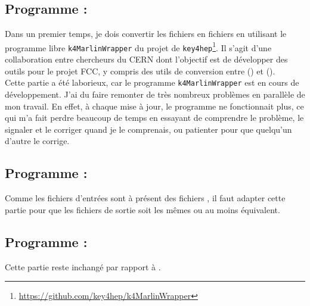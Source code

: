 \subsection{Programme : \convert}

Dans un premier temps, je dois convertir les fichiers \SLCIO en fichiers \ROOT en utilisant le programme libre \texttt{k4MarlinWrapper} du projet de \texttt{key4hep}\footnote{\url{https://github.com/key4hep/k4MarlinWrapper}}. 
Il s'agit d'une collaboration entre chercheurs du CERN dont l'objectif est de développer des outils pour le projet FCC, y compris des utils de conversion entre \LCIO (\iLCSoft) et \EDMhep (\FCC).%
\\

Cette partie a été laborieux, car le programme \texttt{k4MarlinWrapper} est en cours de développement. 
J'ai du faire remonter de très nombreux problèmes en parallèle de mon travail. 
En effet, à chaque mise à jour, le programme ne fonctionnait plus, ce qui m'a fait perdre beaucoup de temps en essayant de comprendre le problème, le signaler et le corriger quand je le comprenais, ou patienter pour que quelqu'un d'autre le corrige. 

\subsection{Programme : \processor}

Comme les fichiers d'entrées sont à présent des fichiers \ROOT, il faut adapter cette partie pour que les fichiers de sortie soit les mêmes ou au moins équivalent.

\subsection{Programme : \analysis}

Cette partie reste inchangé par rapport à \ilcsoft.
